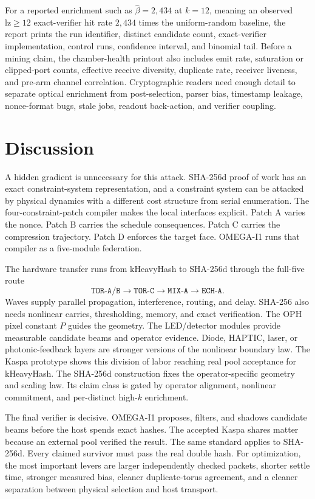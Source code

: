 \documentclass[11pt]{article}
\theoremstyle{definition}
\theoremstyle{remark}
\begin{document}
For a reported enrichment such as \(\widehat\beta=2{,}434\) at \(k=12\), meaning
an observed \(\mathrm{lz}\ge12\) exact-verifier hit rate \(2{,}434\) times the
uniform-random baseline, the report prints the run identifier, distinct
candidate count, exact-verifier implementation, control runs, confidence
interval, and binomial tail. Before a
mining claim, the chamber-health printout also includes emit rate,
saturation or clipped-port counts, effective receive diversity, duplicate rate,
receiver liveness, and pre-arm channel correlation. Cryptographic readers need
enough detail to separate optical enrichment from post-selection, parser bias,
timestamp leakage, nonce-format bugs, stale jobs, readout back-action, and
verifier coupling.

\section{Discussion}

A hidden gradient is unnecessary for this attack. SHA-256d proof of work
has an exact constraint-system representation, and a constraint system can be
attacked by physical dynamics with a different cost structure from serial
enumeration. The four-constraint-patch compiler makes the local interfaces explicit.
Patch A varies the nonce. Patch B carries the schedule consequences. Patch C
carries the compression trajectory. Patch D enforces the target face. OMEGA-I1
runs that compiler as a five-module federation.

The hardware transfer runs from kHeavyHash to SHA-256d through the full-five
route
\[
\texttt{TOR-A/B}\to\texttt{TOR-C}\to\texttt{MIX-A}\to\texttt{ECH-A}.
\]
Waves supply parallel propagation, interference, routing, and delay.
SHA-256 also needs nonlinear carries, thresholding, memory, and exact
verification. The OPH pixel constant \(P\) guides the geometry. The
LED/detector modules provide measurable candidate beams and operator evidence.
Diode, HAPTIC, laser, or photonic-feedback layers are stronger versions of the
nonlinear boundary law. The Kaspa prototype shows this division of labor
reaching real pool acceptance for kHeavyHash. The SHA-256d construction fixes
the operator-specific geometry and scaling law. Its claim class is gated by
operator alignment, nonlinear commitment, and per-distinct high-\(k\)
enrichment.

The final verifier is decisive. OMEGA-I1 proposes, filters, and shadows
candidate beams before the host spends exact hashes. The accepted Kaspa shares
matter because an external pool verified the result. The same standard applies
to SHA-256d. Every claimed survivor must pass the real double hash. For
optimization, the most important levers are larger independently checked
packets, shorter settle time, stronger measured bias, cleaner duplicate-torus
agreement, and a cleaner separation between physical selection and host
transport.
\end{document}
